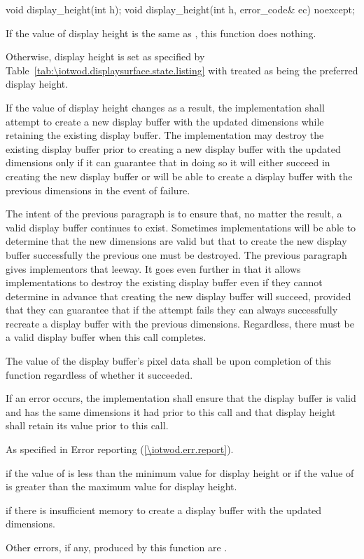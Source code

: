 %
\begin{itemdecl}
void display_height(int h);
void display_height(int h, error_code& ec) noexcept;
\end{itemdecl}
\begin{itemdescr}
\pnum
\effects
If the value of display height is the same as , this function does nothing.

\pnum
Otherwise, display height is set as specified by Table~\ref{tab:\iotwod.displaysurface.state.listing} with  treated as being the preferred display height.

\pnum
If the value of display height changes as a result, the implementation shall attempt to create a new display buffer with the updated dimensions while retaining the existing display buffer. The implementation may destroy the existing display buffer prior to creating a new display buffer with the updated dimensions only if it can guarantee that in doing so it will either succeed in creating the new display buffer or will be able to create a display buffer with the previous dimensions in the event of failure.

\pnum
\begin{note}
The intent of the previous paragraph is to ensure that, no matter the result, a valid display buffer continues to exist. Sometimes implementations will be able to determine that the new dimensions are valid but that to create the new display buffer successfully the previous one must be destroyed. The previous paragraph gives implementors that leeway. It goes even further in that it allows implementations to destroy the existing display buffer even if they cannot determine in advance that creating the new display buffer will succeed, provided that they can guarantee that if the attempt fails they can always successfully recreate a display buffer with the previous dimensions. Regardless, there must be a valid display buffer when this call completes.
\end{note}

\pnum
The value of the display buffer's pixel data shall be \unspecnorm upon completion of this function regardless of whether it succeeded.

\pnum
If an error occurs, the implementation shall ensure that the display buffer is valid and has the same dimensions it had prior to this call and that display height shall retain its value prior to this call.

\pnum
\throws
As specified in Error reporting (\ref{\iotwod.err.report}).

\pnum
\errors
{} if the value of  is less than the minimum value for display height or if the value of  is greater than the maximum value for display height.

\pnum
{} if there is insufficient memory to create a display buffer with the updated dimensions.

\pnum
Other errors, if any, produced by this function are .
\end{itemdescr}

